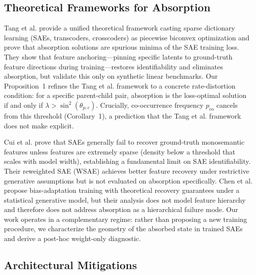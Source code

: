 \documentclass{article}
\begin{document}
\subsection{Theoretical Frameworks for Absorption}

Tang et al. \citeyear{tang2024unified} provide a unified theoretical framework casting sparse
dictionary learning (SAEs, transcoders, crosscoders) as piecewise biconvex optimization and
prove that absorption solutions are spurious minima of the SAE training loss. They show that
feature anchoring---pinning specific latents to ground-truth feature directions during
training---restores identifiability and eliminates absorption, but validate this only on
synthetic linear benchmarks. Our Proposition~1 refines the Tang et al. framework to a
concrete rate-distortion condition: for a specific parent-child pair, absorption is the loss-optimal
solution if and only if $\lambda > \sin^2(\theta_{p,c})$. Crucially, co-occurrence frequency
$p_\text{co}$ cancels from this threshold (Corollary~1), a prediction that the Tang et al.
framework does not make explicit.

Cui et al. \citeyear{cui2025limits} prove that SAEs generally fail to recover ground-truth
monosemantic features unless features are extremely sparse (density below a threshold that
scales with model width), establishing a fundamental limit on SAE identifiability. Their
reweighted SAE (WSAE) achieves better feature recovery under restrictive generative assumptions
but is not evaluated on absorption specifically. Chen et al. \citeyear{chen2025taming} propose
bias-adaptation training with theoretical recovery guarantees under a statistical generative
model, but their analysis does not model feature hierarchy and therefore does not address
absorption as a hierarchical failure mode. Our work operates in a complementary regime:
rather than proposing a new training procedure, we characterize the geometry of the absorbed
state in trained SAEs and derive a post-hoc weight-only diagnostic.


\subsection{Architectural Mitigations}
\end{document}
